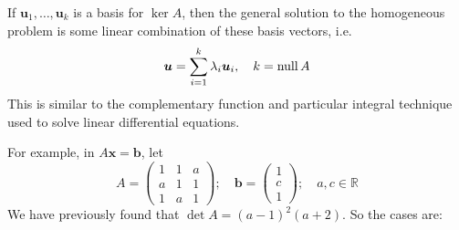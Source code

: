 \documentclass{article}
\begin{document}
If $\bm u_1, \dots, \bm u_k$ is a basis for $\ker A$, then the general solution to the homogeneous problem is some linear combination of these basis vectors, i.e.
\[ \bm u = \sum_{i=1}^k \lambda_i \bm u_i,\quad k = \operatorname{null} A \]
This is similar to the complementary function and particular integral technique used to solve linear differential equations.

For example, in $A\bm x = \bm b$, let
\[ A = \begin{pmatrix}
		1 & 1 & a \\ a & 1 & 1 \\ 1 & a & 1
	\end{pmatrix};\quad \bm b = \begin{pmatrix}
		1 \\ c \\ 1
	\end{pmatrix};\quad a, c \in \mathbb R \]
We have previously found that $\det A = (a-1)^2(a+2)$. So the cases are:
\end{document}
